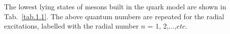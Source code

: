 The lowest lying states of mesons built in the quark model are shown in Tab.~\ref{tab.1.1}.
The above quantum numbers are repeated for the radial excitations, labelled with the radial number $n$ = 1, 2,...,$etc$.

